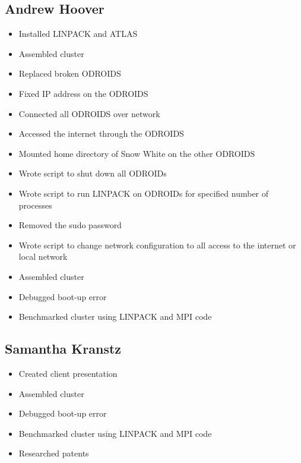 \documentclass{article}
\begin{document}
\subsection*{Andrew Hoover}
\begin{itemize}
	\item Installed LINPACK and ATLAS
	\item Assembled cluster
	\item Replaced broken ODROIDS
	\item Fixed IP address on the ODROIDS
	\item Connected all ODROIDS over network
	\item Accessed the internet through the ODROIDS
	\item Mounted home directory of Snow White on the other ODROIDS
	\item Wrote script to shut down all ODROIDs
	\item Wrote script to run LINPACK on ODROIDs for specified number of processes
	\item Removed the sudo password
	\item Wrote script to change network configuration to all access to the internet or local network
	\item Assembled cluster
	\item Debugged boot-up error
	\item Benchmarked cluster using LINPACK and MPI code
\end{itemize}
\subsection*{Samantha Kranstz}
\begin{itemize}
	\item Created client presentation 
	\item Assembled cluster
	\item Debugged boot-up error
	\item Benchmarked cluster using LINPACK and MPI code
	\item Researched patents
\end{itemize}
\end{document}
